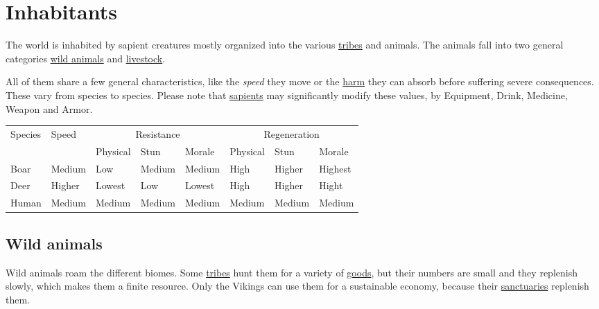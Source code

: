 \section{Inhabitants}\label{ch:World:Inhabitants}

The world is inhabited by sapient creatures mostly organized into the various
\hyperref[ch:Tribes]{tribes} and animals. The animals fall into two general
categories \hyperref[ch:World:Inhabitants:Animals]{wild animals} and
\hyperref[ch:World:Inhbitants:Livestock]{livestock}.

All of them share a few general characteristics, like the \emph{speed} they
move or the \hyperref[ch:Conflict:Combat]{harm} they can absorb before
suffering severe consequences. These vary from species to species. Please note
that \hyperref[ch:World:Inhabitants:Sapients]{sapients} may significantly
modify these values, by \gls{Equipment}, \gls{Drink}, \gls{Medicine},
\gls{Weapon} and \gls{Armor}.

\begin{longtable}{l l lll lll}
	\toprule
	Species    & Speed  & \multicolumn{3}{c}{Resistance} & \multicolumn{3}{c}{Regeneration}                                        \\
	           &        & Physical                       & Stun                             & Morale & Physical & Stun   & Morale  \\
	\midrule
	\Gls{Boar} & Medium & Low                            & Medium                           & Medium & High     & Higher & Highest \\
	\Gls{Deer} & Higher & Lowest                         & Low                              & Lowest & High     & Higher & Hight   \\
	Human      & Medium & Medium                         & Medium                           & Medium & Medium   & Medium & Medium  \\
	\bottomrule
\end{longtable}

\subsection{Wild animals}\label{ch:World:Inhabitants:Animals}

Wild animals roam the different biomes. Some \hyperref[ch:Tribes]{tribes} hunt
them for a variety of \hyperref[ch:Goods:Nature:Animals]{goods}, but their
numbers are small and they replenish slowly, which makes them a finite
resource. Only the \gls{Vikings} can use them for a sustainable economy,
because their \hyperref[ch:Tribes:Vikings:Religion:Forest]{sanctuaries}
replenish them.

